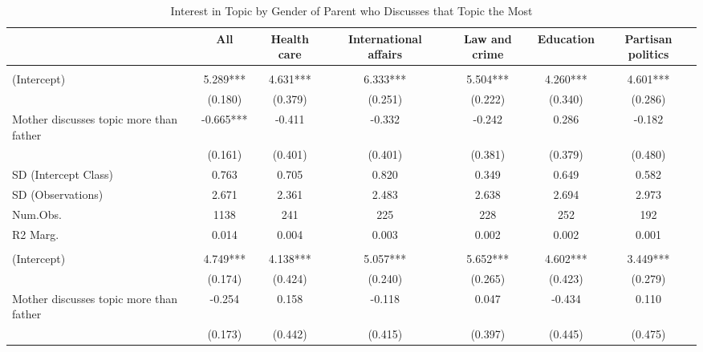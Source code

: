 \documentclass[
  letterpaper,
  DIV=11,
  numbers=noendperiod]{scrreprt}
\begin{document}
\begin{table}
\centering\centering
\caption{Interest in Topic by Gender of Parent who Discusses that Topic the Most \label{tab:lmeParent}}
\centering
\fontsize{6}{8}\selectfont
\begin{tabular}[t]{lcccccc}
\toprule
  & All & Health care & International affairs & Law and crime & Education & Partisan politics\\
\midrule
\addlinespace[0.5em]
\multicolumn{7}{l}{\textit{Boys}}\\
\midrule \hspace{1em}(Intercept) & 5.289*** & 4.631*** & 6.333*** & 5.504*** & 4.260*** & 4.601***\\
\hspace{1em} & (0.180) & (0.379) & (0.251) & (0.222) & (0.340) & (0.286)\\
\hspace{1em}Mother discusses topic more than father & -0.665*** & -0.411 & -0.332 & -0.242 & 0.286 & -0.182\\
\hspace{1em} & (0.161) & (0.401) & (0.401) & (0.381) & (0.379) & (0.480)\\
\hspace{1em}SD (Intercept Class) & 0.763 & 0.705 & 0.820 & 0.349 & 0.649 & 0.582\\
\hspace{1em}SD (Observations) & 2.671 & 2.361 & 2.483 & 2.638 & 2.694 & 2.973\\
\hspace{1em}Num.Obs. & 1138 & 241 & 225 & 228 & 252 & 192\\
\hspace{1em}R2 Marg. & 0.014 & 0.004 & 0.003 & 0.002 & 0.002 & 0.001\\
\addlinespace[0.5em]
\multicolumn{7}{l}{\textit{Girls}}\\
\midrule \hspace{1em}(Intercept) & 4.749*** & 4.138*** & 5.057*** & 5.652*** & 4.602*** & 3.449***\\
\hspace{1em} & (0.174) & (0.424) & (0.240) & (0.265) & (0.423) & (0.279)\\
\hspace{1em}Mother discusses topic more than father & -0.254 & 0.158 & -0.118 & 0.047 & -0.434 & 0.110\\
\hspace{1em} & (0.173) & (0.442) & (0.415) & (0.397) & (0.445) & (0.475)\\

\end{tabular}
\end{table}
\end{document}
